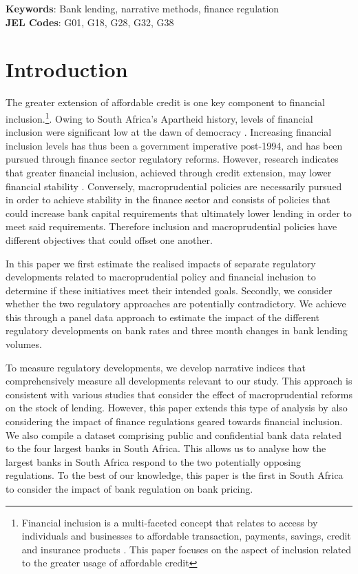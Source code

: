 \documentclass[
  letterpaper,
  DIV=11,
  numbers=noendperiod]{scrartcl}
\begin{document}
\noindent\textbf{Keywords}: Bank lending, narrative methods, finance regulation\\
\textbf{JEL Codes}: G01, G18, G28, G32, G38
\newpage

\section{Introduction}\label{introduction}

The greater extension of affordable credit is one key component to
financial inclusion.\footnote{Financial inclusion is a multi-faceted
  concept that relates to access by individuals and businesses to
  affordable transaction, payments, savings, credit and insurance
  products \citep{WBGweb}. This paper focuses on the aspect of inclusion
  related to the greater usage of affordable credit}. Owing to South
Africa's Apartheid history, levels of financial inclusion were
significant low at the dawn of democracy \citep{hawkins2004}. Increasing
financial inclusion levels has thus been a government imperative
post-1994, and has been pursued through finance sector regulatory
reforms. However, research indicates that greater financial inclusion,
achieved through credit extension, may lower financial stability
\citep{garcia2016}. Conversely, macroprudential policies are necessarily
pursued in order to achieve stability in the finance sector and consists
of policies that could increase bank capital requirements that
ultimately lower lending in order to meet said requirements. Therefore
inclusion and macroprudential policies have different objectives that
could offset one another.

In this paper we first estimate the realised impacts of separate
regulatory developments related to macroprudential policy and financial
inclusion to determine if these initiatives meet their intended goals.
Secondly, we consider whether the two regulatory approaches are
potentially contradictory. We achieve this through a panel data approach
to estimate the impact of the different regulatory developments on bank
rates and three month changes in bank lending volumes.

To measure regulatory developments, we develop narrative indices that
comprehensively measure all developments relevant to our study. This
approach is consistent with various studies that consider the effect of
macroprudential reforms on the stock of lending. However, this paper
extends this type of analysis by also considering the impact of finance
regulations geared towards financial inclusion. We also compile a
dataset comprising public and confidential bank data related to the four
largest banks in South Africa. This allows us to analyse how the largest
banks in South Africa respond to the two potentially opposing
regulations. To the best of our knowledge, this paper is the first in
South Africa to consider the impact of bank regulation on bank pricing.
\end{document}
